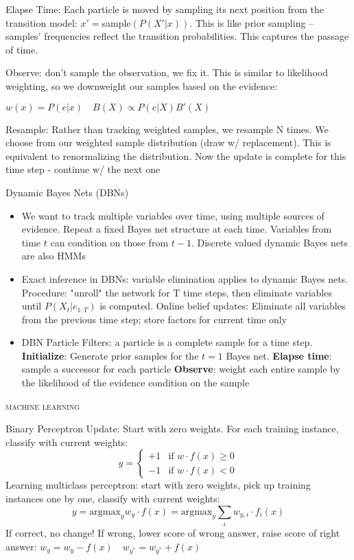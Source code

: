 \documentclass[10pt,twocolumn]{article}
\begin{document}
\begin{itemize}
		 Elapse Time: Each particle is moved by sampling its next position from the transition model: $x'=$sample$(P(X'|x))$. This is like prior sampling -- samples' frequencies reflect the transition probabilities. This captures the passage of time.
		
		 Observe: don't sample the observation, we fix it. This is similar to likelihood weighting, so we downweight our samples based on the evidence: 
		
		$w(x)=P(e|x) \quad B(X)\propto P(e|X)B'(X)$
		
		 Resample: Rather than tracking weighted samples, we resample N times. We choose from our weighted sample distribution (draw w/ replacement). This is equivalent to renormalizing the distribution. Now the update is complete for this time step - continue w/ the next one

	\end{itemize}
	Dynamic Bayes Nets (DBNs)
	\begin{itemize}
		\item We want to track multiple variables over time, using multiple sources of evidence. Repeat a fixed Bayes net structure at each time. Variables from time $t$ can condition on those from $t-1$. Discrete valued dynamic Bayes nets are also HMMs
		\item Exact inference in DBNs: variable elimination applies to dynamic Bayes nets. Procedure: "unroll" the network for T time steps, then eliminate variables until $P(X_t|e_{1:T})$ is computed. Online belief updates: Eliminate all variables from the previous time step; store factors for current time only
		\item DBN Particle Filters: a particle is a complete sample for a time step. \textbf{Initialize}: Generate prior samples for the $t=1$ Bayes net. \textbf{Elapse time}: sample a successor for each particle
			\textbf{Observe}: weight each entire sample by the likelihood of the evidence condition on the sample
	\end{itemize}
	\begin{center}\textsc{machine learning}\end{center} 
		Binary Perceptron Update: Start with zero weights. For each training instance, classify with current weights:\[ y = \left\{ \begin{array}{ll}
		         +1 & \mbox{if $w\cdot f(x) \geq 0$}\\
		        -1 & \mbox{if $w\cdot f(x) < 0$}\end{array} \right. \]
		Learning multiclass perceptron: start with zero weights, pick up training instances one by one, classify with current weights: \[y=\text{argmax}_yw_y\cdot f(x) = \text{argmax}_y \displaystyle\sum_i w_{y,i}\cdot f_i(x) \]If correct, no change! If wrong, lower score of wrong answer, raise score of right answer: $w_y=w_y-f(x) \quad w_{y^*}=w_{y^*}+f(x)$
		
\end{document}

